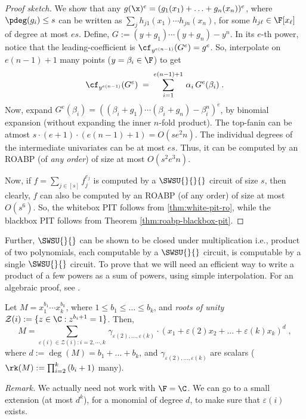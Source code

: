 \begin{proof}[Proof sketch]
We show that any $g(\x)^e = (g_1(x_1)+\hdots +g_n(x_n))^e$, where $\pdeg(g_i) \le s$ can be written as $ \sum_{j} h_{j1}(x_1) \cdots h_{jn}(x_n)$, for some $h_{j\ell} \in \F[x_{\ell}]$ of degree at most $es$. Define, $G := (y+g_1) \cdots (y+g_n)-y^n$. In its $e$-th power, notice that the leading-coefficient is $\cf_{y^{e(n-1)}}(G^e)= g^e$. So, interpolate on $e(n-1)+1$ many points ($y= \beta_i\in\F$) to get 
$$ \cf_{y^{e(n-1)}}(G^e) \;=\; \sum_{i=1}^{e(n-1)+1}\, \alpha_i\, G^e(\beta_i)\;.$$
Now, expand $G^e(\beta_i) = ((\beta_i +g_1) \cdots (\beta_i+g_n)-\beta_i^n)^e$, by binomial expansion (without expanding the inner $n$-fold product). The top-fanin can be atmost $s \cdot (e+1) \cdot (e(n-1)+1)= O(se^2n)$. The individual degrees of the intermediate univariates can be at most $es$. Thus, it can be computed by an ROABP (of {\em any order}) of size at most $O(s^2e^3n)$. 

Now, if $f=\sum_{j \in [s]} f_j^{e_j}$ is computed by a $\SWSU{}{}{}$ circuit of size $s$, then clearly, $f$ can also be computed by an ROABP (of any order) of size at most $O(s^6)$. So, the whitebox PIT follows from \autoref{thm:white-pit-ro}, while the blackbox PIT follows from Theorem \autoref{thm:roabp-blackbox-pit}.
\end{proof}

Further, $\SWSU{}{}$ can be shown to be closed under multiplication i.e., product of two polynomials, each computable by a $\SWSU{}{}$ circuit, is computable by a single $\SWSU{}{}$ circuit. To prove that we will need an efficient way to write a product of a few powers as a sum of powers, using simple interpolation. For an algebraic proof, see  \cite[Proposition~4.3]{CARLINI20125}. 

\begin{lemma} \label{lem:waring-rank}
Let $M= x_1^{b_1} \cdots x_k^{b_k}$, where $1 \le b_1 \le \hdots \le b_k$, and {\em roots of unity} $\mathcal{Z}(i):=\{z \in \C : z^{b_i+1}=1\}$. Then, $$M= \sum_{\varepsilon(i) \in \mathcal{Z}(i): i=2,\cdots,k}\, \gamma_{\varepsilon(2),\hdots,\varepsilon(k)} \cdot \left(x_1 + \varepsilon(2)x_2 + \hdots + \varepsilon(k)x_k\right)^d\;,$$ where  $d:= \deg(M)=b_1+\hdots+b_k$, and  $\gamma_{\varepsilon(2),\hdots,\varepsilon(k)}$ are scalars ($\rk(M):=\prod_{i=2}^k\,(b_i+1)$ many).       
\end{lemma}

{\noindent \em Remark.} We actually need not work with $\F=\C$. We can go to a small extension (at most $d^k$), for a monomial of degree $d$, to make sure that $\varepsilon(i)$ exists. 

